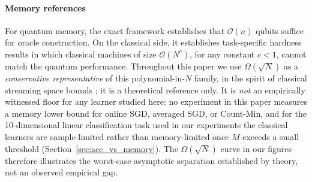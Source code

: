 \documentclass[sensors,article,submit,pdftex,moreauthors]{Definitions/mdpi}
\newcommand{\bigO}{\mathcal{O}}
\providecommand{\DIFadd}[1]{{\protect\color{blue}#1}} %
\providecommand{\DIFdel}[1]{} %
\providecommand{\DIFaddbegin}{} %
\providecommand{\DIFaddend}{} %
\providecommand{\DIFdelbegin}{} %
\providecommand{\DIFdelend}{} %
\begin{document}
\DIFdelbegin \DIFdel{For the quantum memoryrequirement}\DIFdelend \DIFaddbegin \paragraph{\DIFadd{Memory references}} \DIFadd{For quantum memory}\DIFaddend , the exact framework establishes that $\bigO(n)$ qubits suffice for oracle construction. On the classical side, it establishes task-specific hardness results in which classical machines of size $\bigO(N^{c})$, for any constant $c < 1$, cannot match the quantum performance. Throughout this paper we use $\Omega(\sqrt{N})$ as a \emph{conservative representative} of this polynomial-in-$N$ family, in the spirit of classical streaming space bounds \citep{alon1999space, kallaugher2021streaming}; it is \DIFaddbegin \DIFadd{a theoretical reference only. It is }\DIFaddend \emph{not} an empirically witnessed floor for \DIFaddbegin \DIFadd{any learner studied here: no experiment in this paper measures a memory lower bound for online SGD, averaged SGD, or Count-Min, and for }\DIFaddend the \DIFdelbegin \DIFdel{online-gradient classical learners studied here. For the }\DIFdelend 10-dimensional linear classification task used in our experiments \DIFdelbegin \DIFdel{, the classical learner is in fact }\DIFdelend \DIFaddbegin \DIFadd{the classical learners are }\DIFaddend sample-limited rather than memory-limited once $M$ exceeds a small threshold (Section~\ref{sec:acc_vs_memory}). The $\Omega(\sqrt{N})$ curve in our figures therefore illustrates the worst-case asymptotic separation \DIFdelbegin \DIFdel{, not the empirical gapon the specific task studied}\DIFdelend \DIFaddbegin \DIFadd{established by theory, not an observed empirical gap}\DIFaddend .
\end{document}
